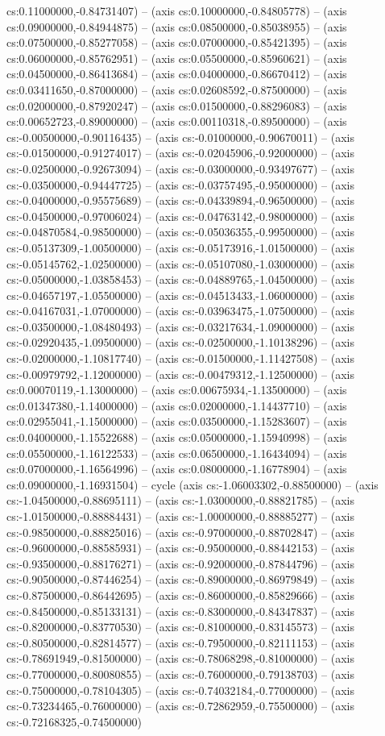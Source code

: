 cs:0.11000000,-0.84731407) -- (axis cs:0.10000000,-0.84805778) -- (axis cs:0.09000000,-0.84944875) -- (axis cs:0.08500000,-0.85038955) -- (axis cs:0.07500000,-0.85277058) -- (axis cs:0.07000000,-0.85421395) -- (axis cs:0.06000000,-0.85762951) -- (axis cs:0.05500000,-0.85960621) -- (axis cs:0.04500000,-0.86413684) -- (axis cs:0.04000000,-0.86670412) -- (axis cs:0.03411650,-0.87000000) -- (axis cs:0.02608592,-0.87500000) -- (axis cs:0.02000000,-0.87920247) -- (axis cs:0.01500000,-0.88296083) -- (axis cs:0.00652723,-0.89000000) -- (axis cs:0.00110318,-0.89500000) -- (axis cs:-0.00500000,-0.90116435) -- (axis cs:-0.01000000,-0.90670011) -- (axis cs:-0.01500000,-0.91274017) -- (axis cs:-0.02045906,-0.92000000) -- (axis cs:-0.02500000,-0.92673094) -- (axis cs:-0.03000000,-0.93497677) -- (axis cs:-0.03500000,-0.94447725) -- (axis cs:-0.03757495,-0.95000000) -- (axis cs:-0.04000000,-0.95575689) -- (axis cs:-0.04339894,-0.96500000) -- (axis cs:-0.04500000,-0.97006024) -- (axis cs:-0.04763142,-0.98000000) -- (axis cs:-0.04870584,-0.98500000) -- (axis cs:-0.05036355,-0.99500000) -- (axis cs:-0.05137309,-1.00500000) -- (axis cs:-0.05173916,-1.01500000) -- (axis cs:-0.05145762,-1.02500000) -- (axis cs:-0.05107080,-1.03000000) -- (axis cs:-0.05000000,-1.03858453) -- (axis cs:-0.04889765,-1.04500000) -- (axis cs:-0.04657197,-1.05500000) -- (axis cs:-0.04513433,-1.06000000) -- (axis cs:-0.04167031,-1.07000000) -- (axis cs:-0.03963475,-1.07500000) -- (axis cs:-0.03500000,-1.08480493) -- (axis cs:-0.03217634,-1.09000000) -- (axis cs:-0.02920435,-1.09500000) -- (axis cs:-0.02500000,-1.10138296) -- (axis cs:-0.02000000,-1.10817740) -- (axis cs:-0.01500000,-1.11427508) -- (axis cs:-0.00979792,-1.12000000) -- (axis cs:-0.00479312,-1.12500000) -- (axis cs:0.00070119,-1.13000000) -- (axis cs:0.00675934,-1.13500000) -- (axis cs:0.01347380,-1.14000000) -- (axis cs:0.02000000,-1.14437710) -- (axis cs:0.02955041,-1.15000000) -- (axis cs:0.03500000,-1.15283607) -- (axis cs:0.04000000,-1.15522688) -- (axis cs:0.05000000,-1.15940998) -- (axis cs:0.05500000,-1.16122533) -- (axis cs:0.06500000,-1.16434094) -- (axis cs:0.07000000,-1.16564996) -- (axis cs:0.08000000,-1.16778904) -- (axis cs:0.09000000,-1.16931504) -- cycle (axis cs:-1.06003302,-0.88500000) -- (axis cs:-1.04500000,-0.88695111) -- (axis cs:-1.03000000,-0.88821785) -- (axis cs:-1.01500000,-0.88884431) -- (axis cs:-1.00000000,-0.88885277) -- (axis cs:-0.98500000,-0.88825016) -- (axis cs:-0.97000000,-0.88702847) -- (axis cs:-0.96000000,-0.88585931) -- (axis cs:-0.95000000,-0.88442153) -- (axis cs:-0.93500000,-0.88176271) -- (axis cs:-0.92000000,-0.87844796) -- (axis cs:-0.90500000,-0.87446254) -- (axis cs:-0.89000000,-0.86979849) -- (axis cs:-0.87500000,-0.86442695) -- (axis cs:-0.86000000,-0.85829666) -- (axis cs:-0.84500000,-0.85133131) -- (axis cs:-0.83000000,-0.84347837) -- (axis cs:-0.82000000,-0.83770530) -- (axis cs:-0.81000000,-0.83145573) -- (axis cs:-0.80500000,-0.82814577) -- (axis cs:-0.79500000,-0.82111153) -- (axis cs:-0.78691949,-0.81500000) -- (axis cs:-0.78068298,-0.81000000) -- (axis cs:-0.77000000,-0.80080855) -- (axis cs:-0.76000000,-0.79138703) -- (axis cs:-0.75000000,-0.78104305) -- (axis cs:-0.74032184,-0.77000000) -- (axis cs:-0.73234465,-0.76000000) -- (axis cs:-0.72862959,-0.75500000) -- (axis cs:-0.72168325,-0.74500000) 